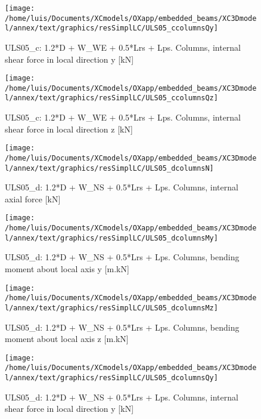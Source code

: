 \begin{figure}
\begin{center}
\texttt{[image: /home/luis/Documents/XCmodels/OXapp/embedded\_beams/XC3Dmodel/annex/text/graphics/resSimplLC/ULS05\_ccolumnsQy]}
\caption{ULS05_c: 1.2*D + W_WE + 0.5*Lrs + Lps. Columns, internal shear force in local direction y [kN]}
\end{center}
\end{figure}
\begin{figure}
\begin{center}
\texttt{[image: /home/luis/Documents/XCmodels/OXapp/embedded\_beams/XC3Dmodel/annex/text/graphics/resSimplLC/ULS05\_ccolumnsQz]}
\caption{ULS05_c: 1.2*D + W_WE + 0.5*Lrs + Lps. Columns, internal shear force in local direction z [kN]}
\end{center}
\end{figure}
\clearpage
\begin{figure}
\begin{center}
\texttt{[image: /home/luis/Documents/XCmodels/OXapp/embedded\_beams/XC3Dmodel/annex/text/graphics/resSimplLC/ULS05\_dcolumnsN]}
\caption{ULS05_d: 1.2*D + W_NS + 0.5*Lrs + Lps. Columns, internal axial force [kN]}
\end{center}
\end{figure}
\begin{figure}
\begin{center}
\texttt{[image: /home/luis/Documents/XCmodels/OXapp/embedded\_beams/XC3Dmodel/annex/text/graphics/resSimplLC/ULS05\_dcolumnsMy]}
\caption{ULS05_d: 1.2*D + W_NS + 0.5*Lrs + Lps. Columns, bending moment about local axis y [m.kN]}
\end{center}
\end{figure}
\begin{figure}
\begin{center}
\texttt{[image: /home/luis/Documents/XCmodels/OXapp/embedded\_beams/XC3Dmodel/annex/text/graphics/resSimplLC/ULS05\_dcolumnsMz]}
\caption{ULS05_d: 1.2*D + W_NS + 0.5*Lrs + Lps. Columns, bending moment about local axis z [m.kN]}
\end{center}
\end{figure}
\begin{figure}
\begin{center}
\texttt{[image: /home/luis/Documents/XCmodels/OXapp/embedded\_beams/XC3Dmodel/annex/text/graphics/resSimplLC/ULS05\_dcolumnsQy]}
\caption{ULS05_d: 1.2*D + W_NS + 0.5*Lrs + Lps. Columns, internal shear force in local direction y [kN]}
\end{center}
\end{figure}
